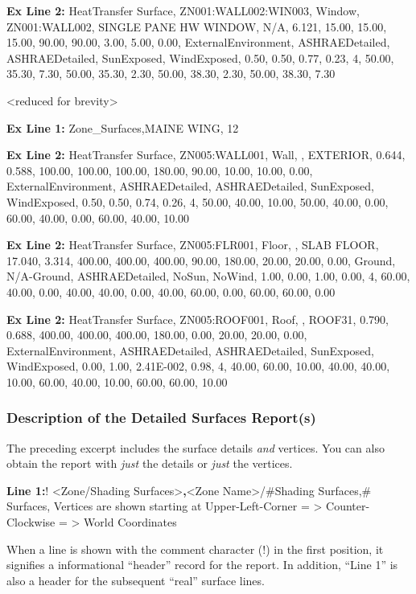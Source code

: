 \textbf{Ex Line 2:} HeatTransfer Surface, ZN001:WALL002:WIN003, Window, ZN001:WALL002, SINGLE PANE HW WINDOW, N/A, 6.121, 15.00, 15.00, 15.00, 90.00, 90.00, 3.00, 5.00, 0.00, ExternalEnvironment, ASHRAEDetailed, ASHRAEDetailed, SunExposed, WindExposed, 0.50, 0.50, 0.77, 0.23, 4, 50.00, 35.30, 7.30, 50.00, 35.30, 2.30, 50.00, 38.30, 2.30, 50.00, 38.30, 7.30

\textless{}reduced for brevity\textgreater{}

\textbf{Ex Line 1:} Zone\_Surfaces,MAINE WING, 12

\textbf{Ex Line 2:} HeatTransfer Surface, ZN005:WALL001, Wall, , EXTERIOR, 0.644, 0.588, 100.00, 100.00, 100.00, 180.00, 90.00, 10.00, 10.00, 0.00, ExternalEnvironment, ASHRAEDetailed, ASHRAEDetailed, SunExposed, WindExposed, 0.50, 0.50, 0.74, 0.26, 4, 50.00, 40.00, 10.00, 50.00, 40.00, 0.00, 60.00, 40.00, 0.00, 60.00, 40.00, 10.00

\textbf{Ex Line 2:} HeatTransfer Surface, ZN005:FLR001, Floor, , SLAB FLOOR, 17.040, 3.314, 400.00, 400.00, 400.00, 90.00, 180.00, 20.00, 20.00, 0.00, Ground, N/A-Ground, ASHRAEDetailed, NoSun, NoWind, 1.00, 0.00, 1.00, 0.00, 4, 60.00, 40.00, 0.00, 40.00, 40.00, 0.00, 40.00, 60.00, 0.00, 60.00, 60.00, 0.00

\textbf{Ex Line 2:} HeatTransfer Surface, ZN005:ROOF001, Roof, , ROOF31, 0.790, 0.688, 400.00, 400.00, 400.00, 180.00, 0.00, 20.00, 20.00, 0.00, ExternalEnvironment, ASHRAEDetailed, ASHRAEDetailed, SunExposed, WindExposed, 0.00, 1.00, 2.41E-002, 0.98, 4, 40.00, 60.00, 10.00, 40.00, 40.00, 10.00, 60.00, 40.00, 10.00, 60.00, 60.00, 10.00

\subsubsection{Description of the Detailed Surfaces Report(s)}\label{description-of-the-detailed-surfaces-reports}

The preceding excerpt includes the surface details \emph{and} vertices. You can also obtain the report with \emph{just} the details or \emph{just} the vertices.

\textbf{Line 1:}! \textless{}Zone/Shading Surfaces\textgreater{}\textbf{,}\textless{}Zone Name\textgreater{}/\#Shading Surfaces,\# Surfaces, Vertices are shown starting at Upper-Left-Corner = \textgreater{} Counter-Clockwise = \textgreater{} World Coordinates

When a line is shown with the comment character (!) in the first position, it signifies a informational ``header'' record for the report. In addition, ``Line 1'' is also a header for the subsequent ``real'' surface lines.

